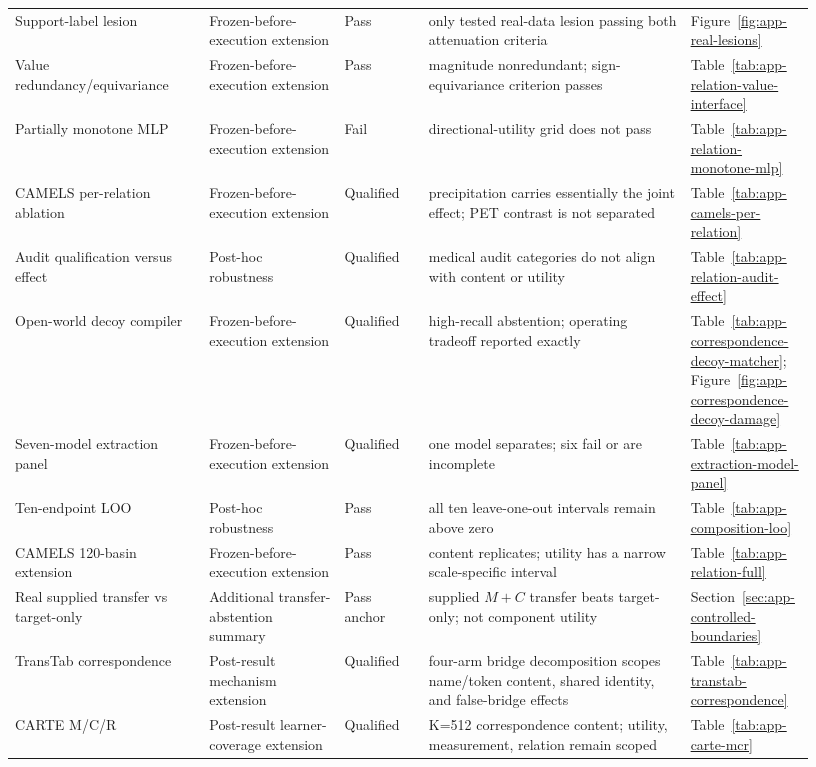 \begin{longtable}{P{0.23\linewidth}P{0.16\linewidth}P{0.10\linewidth}P{0.31\linewidth}P{0.13\linewidth}}
Support-label lesion & Frozen-before-execution extension & Pass & only tested real-data lesion passing both attenuation criteria & Figure~\ref{fig:app-real-lesions} \\
Value redundancy/equivariance & Frozen-before-execution extension & Pass & magnitude nonredundant; sign-equivariance criterion passes & Table~\ref{tab:app-relation-value-interface} \\
Partially monotone MLP & Frozen-before-execution extension & Fail & directional-utility grid does not pass & Table~\ref{tab:app-relation-monotone-mlp} \\
CAMELS per-relation ablation & Frozen-before-execution extension & Qualified & precipitation carries essentially the joint effect; PET contrast is not separated & Table~\ref{tab:app-camels-per-relation} \\
Audit qualification versus effect & Post-hoc robustness & Qualified & medical audit categories do not align with content or utility & Table~\ref{tab:app-relation-audit-effect} \\
Open-world decoy compiler & Frozen-before-execution extension & Qualified & high-recall abstention; operating tradeoff reported exactly & Table~\ref{tab:app-correspondence-decoy-matcher}; Figure~\ref{fig:app-correspondence-decoy-damage} \\
Seven-model extraction panel & Frozen-before-execution extension & Qualified & one model separates; six fail or are incomplete & Table~\ref{tab:app-extraction-model-panel} \\
Ten-endpoint LOO & Post-hoc robustness & Pass & all ten leave-one-out intervals remain above zero & Table~\ref{tab:app-composition-loo} \\
CAMELS 120-basin extension & Frozen-before-execution extension & Pass & content replicates; utility has a narrow scale-specific interval & Table~\ref{tab:app-relation-full} \\
Real supplied transfer vs target-only & Additional transfer-abstention summary & Pass anchor & supplied $M+C$ transfer beats target-only; not component utility & Section~\ref{sec:app-controlled-boundaries} \\
TransTab correspondence & Post-result mechanism extension & Qualified & four-arm bridge decomposition scopes name/token content, shared identity, and false-bridge effects & Table~\ref{tab:app-transtab-correspondence} \\
CARTE M/C/R & Post-result learner-coverage extension & Qualified & K=512 correspondence content; utility, measurement, relation remain scoped & Table~\ref{tab:app-carte-mcr} \\

\end{longtable}
